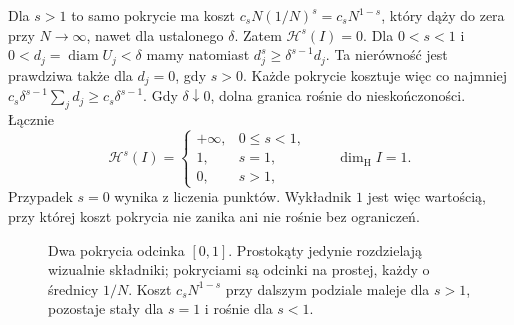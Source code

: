 Dla $s>1$ to samo pokrycie ma koszt
$c_sN(1/N)^s=c_sN^{1-s}$, który dąży do zera
przy $N\to\infty$, nawet dla ustalonego $\delta$.
Zatem $\mathcal H^s(I)=0$.
Dla $0<s<1$ i $0<d_j=\operatorname{diam}U_j<\delta$
mamy natomiast $d_j^s\geq\delta^{s-1}d_j$.
Ta nierówność jest prawdziwa także dla $d_j=0$, gdy $s>0$.
Każde pokrycie kosztuje więc co najmniej
$c_s\delta^{s-1}\sum_jd_j\geq c_s\delta^{s-1}$.
Gdy $\delta\downarrow0$, dolna granica rośnie do nieskończoności.
Łącznie
\[
 \mathcal H^s(I)=
 \begin{cases}
  +\infty,&0\leq s<1,\\
  1,&s=1,\\
  0,&s>1,
 \end{cases}
 \qquad \dim_{\mathrm H}I=1.
\]
Przypadek $s=0$ wynika z liczenia punktów.
Wykładnik $1$ jest więc wartością, przy której
koszt pokrycia nie zanika ani nie rośnie bez ograniczeń.

\begin{figure}[H]
\centering
{}
\caption{Dwa pokrycia odcinka $[0,1]$.
Prostokąty jedynie rozdzielają wizualnie składniki;
pokryciami są odcinki na prostej, każdy o średnicy $1/N$.
Koszt $c_sN^{1-s}$ przy dalszym podziale maleje dla $s>1$,
pozostaje stały dla $s=1$ i rośnie dla $s<1$.}
\label{fig:hausdorff-pokrycia-odcinka}
\end{figure}

